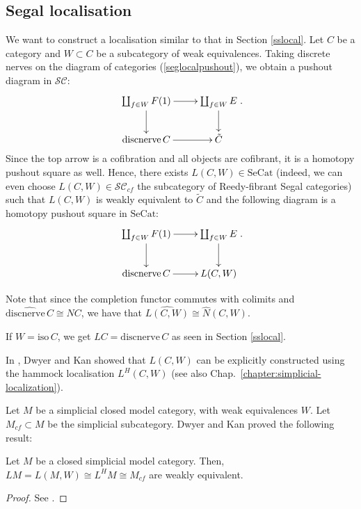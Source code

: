 \begin{refsection}
\subsection{Segal localisation}
We want to construct a localisation similar to that in Section \ref{sslocal}. Let $C$ be a category and $W\subset C$ be a subcategory of weak equivalences. Taking discrete nerves on the diagram of categories (\ref{seglocalpushout}), we obtain a pushout diagram in $\mathcal{SC}$:
$$\xymatrix{\coprod_{f\in W}F(1)\ar[r]\ar[d]&\coprod_{f\in W}E\ar[d]\\\mathrm{discnerve}\,C\ar[r]&\tilde C}.$$
Since the top arrow is a cofibration and all objects are cofibrant, it is a homotopy pushout square as well. Hence, there exists $L(C,W)\in\mathrm{SeCat}$ (indeed, we can even choose $L(C,W)\in\mathcal{SC}_{cf}$ the subcategory of Reedy-fibrant Segal categories) such that $L(C,W)$ is weakly equivalent to $\tilde C$ and the following diagram is a homotopy pushout square in $\mathrm{SeCat}$:
$$\xymatrix{\coprod_{f\in W}F(1)\ar[r]\ar[d]&\coprod_{f\in W}E\ar[d]\\\mathrm{discnerve}\,C\ar[r]&L(C,W)}.$$

Note that since the completion functor commutes with colimits and $\widehat{\mathrm{discnerve}\,C}\cong NC$, we have that $\widehat{L(C,W)}\cong\hat N(C,W)$.

If $W=\mathrm{iso}\,C$, we get $LC=\mathrm{discnerve}\,C$ as seen in Section \ref{sslocal}.

In \cite{dkcomputing}, Dwyer and Kan showed that $L(C,W)$ can be explicitly constructed using the hammock localisation $L^H(C,W)$ (see also Chap.~\ref{chapter:simplicial-localization}).

Let $M$ be a simplicial closed model category, with weak equivalences $W$. Let $M_{cf}\subset M$ be the simplicial subcategory. Dwyer and Kan proved the following result:

\begin{thm}
Let $M$ be a closed simplicial model category. Then, $LM=L(M,W)\cong L^HM\cong M_{cf}$ are weakly equivalent.
\end{thm}
\begin{proof}
See \cite{dkfunction}.
\end{proof}


\end{refsection}
